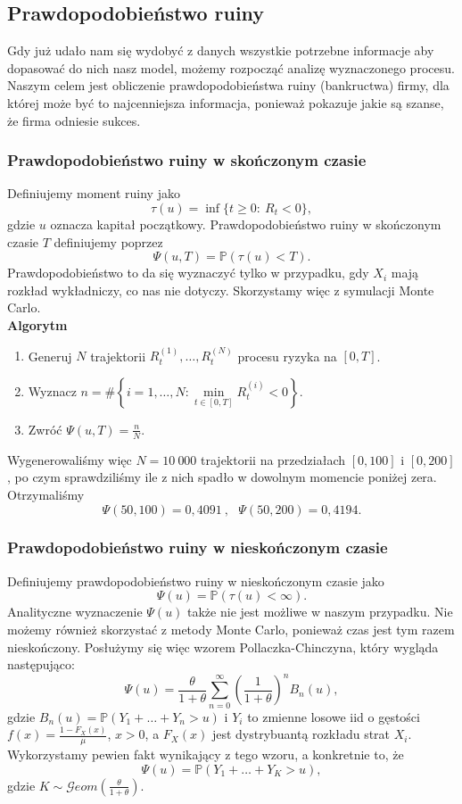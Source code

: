 \documentclass[12pt]{mwart}
\begin{document}
	
	
	\subsection{Prawdopodobieństwo ruiny}
	\noindent Gdy już udało nam się wydobyć z danych wszystkie potrzebne informacje aby dopasować do nich nasz model, możemy rozpocząć analizę wyznaczonego procesu. Naszym celem jest obliczenie prawdopodobieństwa ruiny (bankructwa) firmy, dla której może być to najcenniejsza informacja, ponieważ pokazuje jakie są szanse, że firma odniesie sukces.
	
	\subsubsection{Prawdopodobieństwo ruiny w skończonym czasie}
	\noindent Definiujemy moment ruiny jako
	$$ \tau(u) = \inf\{t \geq 0: \ R_t < 0\}, $$
	gdzie $u$ oznacza kapitał początkowy. Prawdopodobieństwo ruiny w skończonym czasie $T$ definiujemy poprzez
	$$ \Psi(u, T) = \mathbb{P}(\tau(u) < T). $$
	Prawdopodobieństwo to da się wyznaczyć tylko w przypadku, gdy $X_i$ mają rozkład wykładniczy, co nas nie dotyczy. Skorzystamy więc z symulacji Monte Carlo.\\
	\newpage
	\noindent \textbf{Algorytm}
	\begin{enumerate}[leftmargin=10mm]
		\item Generuj $N$ trajektorii $R_t^{(1)}, \dots, R_t^{(N)}$ procesu ryzyka na $[0, T]$.
		\item Wyznacz $ n = \#\left\{ i = 1,\dots,N: \min\limits_{t \in [0, T]} R_t^{(i)} < 0 \right\} $.
		\item Zwróć $\Psi(u, T) = \frac{n}{N}$.
	\end{enumerate}
	Wygenerowaliśmy więc $N = 10\ 000$ trajektorii na przedziałach $[0, 100]$ i $[0, 200]$, po czym sprawdziliśmy ile z nich spadło w dowolnym momencie poniżej zera. Otrzymaliśmy
	$$ \Psi(50, 100) = 0,4091 \ , \ \ \ \Psi(50, 200) = 0,4194 .$$
	
	\subsubsection{Prawdopodobieństwo ruiny w nieskończonym czasie}
	\noindent Definiujemy prawdopodobieństwo ruiny w nieskończonym czasie jako
	$$ \Psi(u) = \mathbb{P}(\tau(u) < \infty). $$
	Analityczne wyznaczenie $\Psi(u)$ także nie jest możliwe w naszym przypadku. Nie możemy również skorzystać z metody Monte Carlo, ponieważ czas jest tym razem nieskończony. Posłużymy się więc wzorem Pollaczka-Chinczyna, który wygląda następująco:
	$$ \Psi(u) = \frac{\theta}{1 + \theta} \sum_{n=0}^{\infty} \left( \frac{1}{1 + \theta} \right)^n B_n(u), $$
	gdzie $B_n(u) = \mathbb{P}(Y_1 + \dots + Y_n > u)$ i $Y_i$ to zmienne losowe iid o gęstości \mbox{$f(x) = \frac{1 - F_X(x)}{\mu}$}, $x > 0$, a $F_X(x)$ jest dystrybuantą rozkładu strat $X_i$. Wykorzystamy pewien fakt wynikający z tego wzoru, a konkretnie to, że
	$$ \Psi(u) = \mathbb{P}(Y_1 + \dots + Y_K > u), $$
	gdzie $K \sim \mathcal{G}eom \left( \frac{\theta}{1+\theta} \right)$.\\
	
\end{document}
